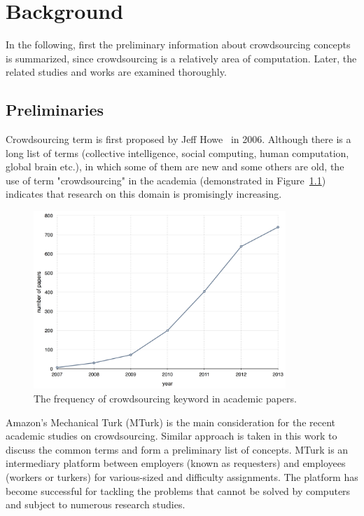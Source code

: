 \chapter{Background}
\label{chap:background}

In the following, first the preliminary information about crowdsourcing concepts 
is summarized, since crowdsourcing is a relatively area of computation. Later,
the related studies and works are examined thoroughly.

\section{Preliminaries}
Crowdsourcing term is first proposed by Jeff Howe~\cite{Howe2006b} in 2006. 
Although there is a long list of terms (collective intelligence, social computing, 
human computation, global brain etc.), in which some of them are new and some 
others are old, the use of term "crowdsourcing" in the academia (demonstrated in 
Figure~\ref{fig:keywordstats}) indicates that research on this domain is promisingly 
increasing.

\begin{figure}[ht]
	\centering
	\includegraphics[width=0.85\textwidth]{figures/keyword_statistics.png}
	\caption[The frequency of crowdsourcing keyword in academic papers.]{The frequency of crowdsourcing keyword in academic papers.\footnotemark}
	\label{fig:keywordstats}
\end{figure}


Amazon's Mechanical Turk (MTurk) is the main consideration for the recent 
academic studies on crowdsourcing. Similar approach is 
taken in this work to discuss the common terms and form a preliminary list of concepts. 
MTurk is an intermediary platform between employers (known as requesters) 
and employees (workers or turkers) for various-sized and difficulty assignments. 
The platform has become successful for tackling the problems that cannot be 
solved by computers and subject to numerous research studies.

